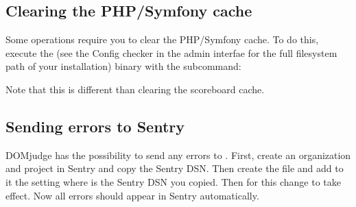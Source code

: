 \documentclass[a4paper,10pt,english,openany]{sphinxmanual}
\begin{document}
\begin{sphinxVerbatim}[commandchars=\\\{\}]
   \PYGZbs{}
     \PYGZbs{}
      \PYGZbs{}
    
\end{sphinxVerbatim}


\subsection{Clearing the PHP/Symfony cache}
\label{\detokenize{config-advanced:clearing-the-php-symfony-cache}}\label{\detokenize{config-advanced:clear-cache}}
\sphinxAtStartPar
Some operations require you to clear the PHP/Symfony cache. To do this, execute
the  (see the Config checker in the admin interfae for the
full filesystem path of your installation) binary with the  subcommand:

\begin{sphinxVerbatim}[commandchars=\\\{\}]
 
\end{sphinxVerbatim}

\sphinxAtStartPar
Note that this is different than clearing the scoreboard cache.


\subsection{Sending errors to Sentry}
\label{\detokenize{config-advanced:sending-errors-to-sentry}}
\sphinxAtStartPar
DOMjudge has the possibility to send any errors to . First, create an
organization and project in Sentry and copy the Sentry DSN. Then create the file
 and add to it the setting  where
 is the Sentry DSN you copied. Then {\hyperref[\detokenize{config-advanced:clear-cache}]{}}
for this change to take effect. Now all errors should appear in Sentry
automatically.
\end{document}
